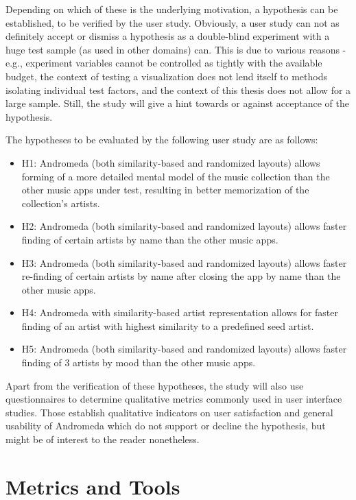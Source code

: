 Depending on which of these is the underlying motivation, a hypothesis can be established, to be verified by the user study. Obviously, a user study can not as definitely accept or dismiss a hypothesis as a double-blind experiment with a huge test sample (as used in other domains) can. This is due to various reasons - e.g., experiment variables cannot be controlled as tightly with the available budget, the context of testing a visualization does not lend itself to methods isolating individual test factors, and the context of this thesis does not allow for a large sample. Still, the study will give a hint towards or against acceptance of the hypothesis.

The hypotheses to be evaluated by the following user study are as follows:

\begin{itemize}
	\item H1: Andromeda (both similarity-based and randomized layouts) allows forming of a more detailed mental model of the music collection than the other music apps under test, resulting in better memorization of the collection's artists.
	\item H2: Andromeda (both similarity-based and randomized layouts) allows faster finding of certain artists by name than the other music apps.
	\item H3: Andromeda (both similarity-based and randomized layouts) allows faster re-finding of certain artists by name after closing the app by name than the other music apps.
	\item H4: Andromeda with similarity-based artist representation allows for faster finding of an artist with highest similarity to a predefined seed artist.
	\item H5: Andromeda (both similarity-based and randomized layouts) allows faster finding of 3 artists by mood than the other music apps.
\end{itemize}

Apart from the verification of these hypotheses, the study will also use questionnaires to determine qualitative metrics commonly used in user interface studies. Those establish qualitative indicators on user satisfaction and general usability of Andromeda which do not support or decline the hypothesis, but might be of interest to the reader nonetheless.

\section{Metrics and Tools}


